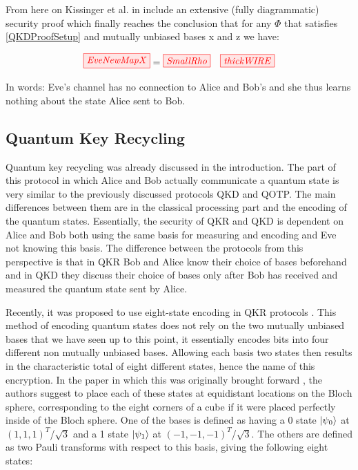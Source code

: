 \documentclass[]{article}
\begin{document}
From here on Kissinger et al. in \cite{Kissinger2017} include an extensive (fully diagrammatic) security proof which finally reaches the conclusion that for any $\Phi$ that satisfies \ref{QKDProofSetup} and mutually unbiased bases x and z we have:

\begin{equation}
\tikzfig{EveNewMapX} = \tikzfig{SmallRho}  ~~~ \tikzfig{thickWIRE}
\end{equation}

In words: Eve's channel has no connection to Alice and Bob's and she thus learns nothing about the state Alice sent to Bob.


\subsection{Quantum Key Recycling}
\label{section:qkr}

Quantum key recycling was already discussed in the introduction. The part of this protocol in which Alice and Bob actually communicate a quantum state is very similar to the previously discussed protocols QKD and QOTP. The main differences between them are in the classical processing part and the encoding of the quantum states. Essentially, the security of QKR and QKD is dependent on Alice and Bob both using the same basis for measuring and encoding and Eve not knowing this basis. The difference between the protocols from this perspective is that in QKR Bob and Alice know their choice of bases beforehand and in QKD they discuss their choice of bases only after Bob has received and measured the quantum state sent by Alice.

Recently, it was proposed to use eight-state encoding in QKR protocols \cite{DeVries2016}. This method of encoding quantum states does not rely on the two mutually unbiased bases that we have seen up to this point, it essentially encodes bits into four different non mutually unbiased bases. Allowing each basis two states then results in the characteristic total of eight different states, hence the name of this encryption. In the paper in which this was originally brought forward \cite{DeVries2016}, the authors suggest to place each of these states at equidistant locations on the Bloch sphere, corresponding to the eight corners of a cube if it were placed perfectly inside of the Bloch sphere. One of the bases is defined as having a 0 state $\ket{\psi_{0}}$ at $(1,1,1)^T$/$\sqrt{3}$ and a 1 state $\ket{\psi_{1}}$ at $(-1,-1,-1)^T$/$\sqrt{3}$. The others are defined as two Pauli transforms with respect to this basis, giving the following eight states:
\end{document}

